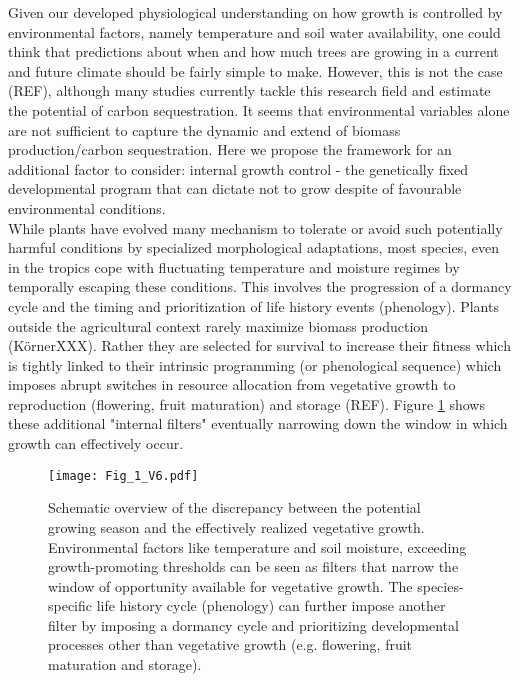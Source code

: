 \documentclass{article}
\begin{document}
		Given our developed physiological understanding on how growth is controlled by environmental factors, namely temperature and soil water availability, one could think that predictions about when and how much trees are growing in a current and future climate should be fairly simple to make. However, this is not the case (REF), although many studies currently tackle this research field and estimate the potential of carbon sequestration. It seems that environmental variables alone are not sufficient to capture the dynamic and extend of biomass production/carbon sequestration.  Here we propose the framework for an additional factor to consider: internal growth control - the genetically fixed developmental program that can dictate not to grow despite of favourable environmental conditions.\\
		
		While plants have evolved many mechanism to tolerate or avoid such potentially harmful conditions by specialized morphological adaptations, most species, even in the tropics cope with fluctuating temperature and moisture regimes by temporally escaping these conditions. This involves the progression of a dormancy cycle and the timing and prioritization of life history events (phenology). Plants outside the agricultural context rarely maximize biomass production (KörnerXXX). Rather they are selected for survival to increase their fitness which is tightly linked to their intrinsic programming (or phenological sequence) which imposes abrupt switches in resource allocation from vegetative growth to reproduction (flowering, fruit maturation) and storage (REF). Figure \ref{fig:fig_1xxx} shows these additional "internal filters" eventually narrowing down the window in which growth can effectively occur.\\

								\begin{figure}
								\centering
								\texttt{[image: Fig\_1\_V6.pdf]} 
								\caption{Schematic overview of the discrepancy between the potential growing season and the effectively realized vegetative growth. Environmental factors like temperature and soil moisture, exceeding growth-promoting thresholds can be seen as filters that narrow the window of opportunity available for vegetative growth. The species-specific life history cycle (phenology) can further impose another filter by imposing a dormancy cycle and prioritizing developmental processes other than vegetative growth (e.g. flowering, fruit maturation and storage). }
								\label{fig:fig_1xxx}
							\end{figure}
\end{document}
